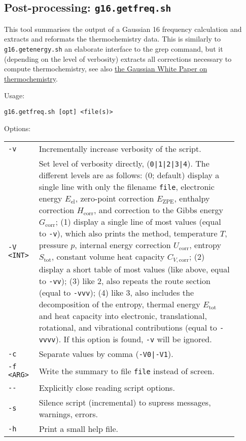 \documentclass[   %
  final,          %
  a4paper         %
]{article}
\begin{document}
\subsection{Post-processing: \texorpdfstring{{\lstinline`g16.getfreq.sh`}}{g16.getfreq.sh}}
\label{sec:g16.getfreq}

This tool summarises the output of a Gaussian 16 frequency calculation 
and extracts and reformats the thermochemistry data.
This is similarly to \lstinline`g16.getenergy.sh` an elaborate interface to the grep command,
but it (depending on the level of verbosity) extracts all corrections necessary 
to compute thermochemistry, see also 
\href{http://gaussian.com/thermo/}{the Gaussian White Paper on thermochemistry}.

Usage: 

\lstinline`g16.getfreq.sh [opt] <file(s)>`

Options:

\begin{tabular}{p{0.1\linewidth}p{0.8\linewidth}}
  {\lstinline`-v`}       & Incrementally increase verbosity of the script. \\
  {\lstinline`-V <INT>`} & Set level of verbosity directly, ({\lstinline`0|1|2|3|4`}).
    The different levels are as follows: %
    (0; default) display a single line with only the filename {\lstinline`file`}, 
        electronic energy \(E_\mathrm{el}\), zero-point correction \(E_\mathrm{ZPE}\),
        enthalpy correction \(H_\mathrm{corr}\), 
        and correction to the Gibbs energy \(G_\mathrm{corr}\);
    (1) display a single line of most values (equal to {\lstinline`-v`}), 
        which also prints the method, temperature \(T\), pressure \(p\), 
        internal energy correction \(U_\mathrm{corr}\),
        entropy  \(S_\mathrm{tot}\), constant volume heat capacity \(C_{V,\mathrm{corr}}\);
    (2) display a short table of most values (like above, equal to {\lstinline`-vv`});
    (3) like 2, also repeats the route section (equal to {\lstinline`-vvv`});
    (4) like 3, also includes the decomposition of the entropy, 
        thermal energy \(E_\mathrm{tot}\) and heat capacity into electronic, translational,
        rotational, and vibrational contributions (equal to {\lstinline`-vvvv`}).
    If this option is found, {\lstinline`-v`} will be ignored. \\
  {\lstinline`-c`}       & Separate values by comma ({\lstinline`-V0|-V1`}). \\
  {\lstinline`-f <ARG>`} & Write the summary to file {\lstinline`file`} instead of screen. \\
  {\lstinline`--`}       & Explicitly close reading script options. \\
  {\lstinline`-s`}       & Silence script (incremental) to supress messages, warnings, errors. \\
  {\lstinline`-h`}       & Print a small help file. \\
\end{tabular}
\end{document}
